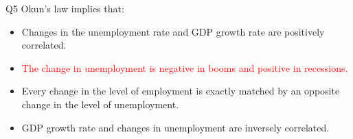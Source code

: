 \documentclass{beamer}
\newcommand{\red}[1]{\textcolor{red}{#1}}
\begin{document}
\begin{frame}{Q5}
\label{slide:Q5}
    Okun's law implies that:
    \begin{itemize}
        \item Changes in the unemployment rate and GDP growth rate are positively correlated.
        \item \red{The change in unemployment is negative in booms and positive in recessions.}
        \item Every change in the level of employment is exactly matched by an opposite change in the level of unemployment.
        \item GDP growth rate and changes in unemployment are inversely correlated.
    \end{itemize}
\end{frame}














\printbibliography[heading=none]
\end{document}
